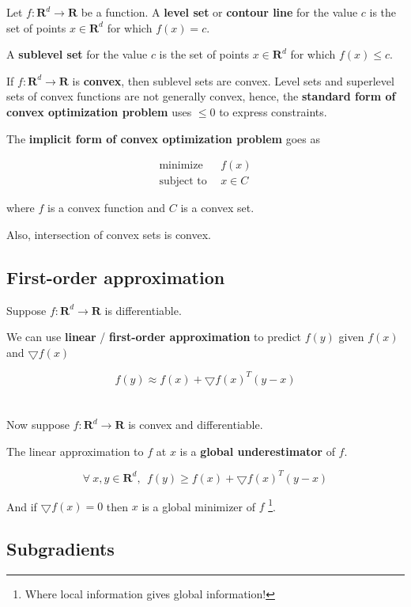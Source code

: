 \documentclass{article}
\begin{document}
Let $f : \mathbf{R}^d \to \mathbf{R}$ be a function.
A \textbf{level set} or \textbf{contour line} for the value $c$ is the set of points $x \in \mathbf{R}^d$ for which $f(x) = c$.

A \textbf{sublevel set} for the value $c$ is the set of points $x \in \mathbf{R}^d$ for which $f(x) \leq c$.

If $f : \mathbf{R}^d \to \mathbf{R}$ is \textbf{convex}, then sublevel sets are convex.
Level sets and superlevel sets of convex functions are not generally convex, hence, the \textbf{standard form of convex optimization problem} uses $\leq 0$ to express constraints.

The \textbf{implicit form of convex optimization problem} goes as

\begin{align*}
\text{minimize}   & ~ ~ f(x) \\
\text{subject to} & ~ ~ x \in C
\end{align*}

where $f$ is a convex function and $C$ is a convex set.

Also, intersection of convex sets is convex.

\subsection{First-order approximation}

Suppose $f : \mathbf{R}^d \to \mathbf{R}$ is differentiable.

We can use \textbf{linear} / \textbf{first-order approximation} to predict $f(y)$ given $f(x)$ and $\bigtriangledown f(x)$

$$
f(y) \approx f(x) + \bigtriangledown f(x)^{T} (y - x)
$$
\\
\\
Now suppose $f : \mathbf{R}^d \to \mathbf{R}$ is convex and differentiable.

The linear approximation to $f$ at $x$ is a \textbf{global underestimator} of $f$.

$$
\forall ~ x, y \in \mathbf{R}^d, ~ ~ f(y) \geq f(x) + \bigtriangledown f(x)^{T} (y - x)
$$

And if $\bigtriangledown f(x) = 0$ then $x$ is a global minimizer of $f$ \footnote{Where local information gives global information!}.

\subsection{Subgradients}
\end{document}
